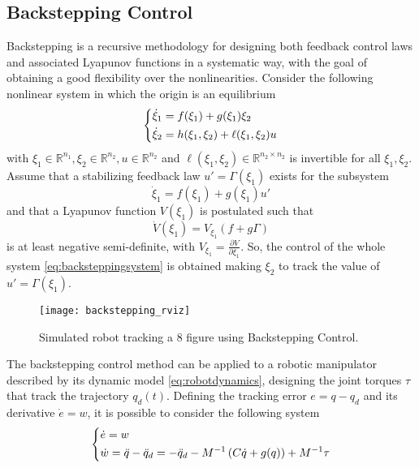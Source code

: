 \subsection{Backstepping Control}
Backstepping is a recursive methodology for designing both feedback control laws and associated Lyapunov functions in a systematic way, with the goal of obtaining a good flexibility over the nonlinearities. Consider the following nonlinear system in which the origin is an equilibrium
\begin{equation}
\begin{dcases}
\dot{\xi}_1 = f(\xi_1) + g(\xi_1)\xi_2 \\
\dot{\xi}_2 = h(\xi_1,\xi_2) + \ell(\xi_1,\xi_2)u
\end{dcases}
\label{eq:backsteppingsystem}
\end{equation}
with $\xi_1\in\mathbb{R}^{n_1}, \xi_2\in\mathbb{R}^{n_2},u\in\mathbb{R}^{n_2}$ and $\ell(\xi_1,\xi_2)\in\mathbb{R}^{n_2 \times n_2}$ is invertible for all $\xi_1,\xi_2$. Assume that a stabilizing feedback law $u'=\Gamma(\xi_1)$ exists for the subsystem 
\begin{equation}
\dot{\xi}_1 = f(\xi_1) + g(\xi_1)u'
\end{equation}
and that a Lyapunov function $V(\xi_1)$ is postulated such that
\begin{equation}
\dot{V}(\xi_1) = V_{\xi_1}(f + g\Gamma)
\end{equation}
is at least negative semi-definite, with $V_{\xi_1} = \frac{\partial{V}}{\partial{\xi_1}}$. So, the control of the whole system \eqref{eq:backsteppingsystem} is obtained making $\xi_2$ to track the value of $u'=\Gamma(\xi_1)$.
\begin{figure}[H]
	\centering
	\texttt{[image: backstepping\_rviz]}
	\caption{Simulated robot tracking a 8 figure using Backstepping Control.}
\end{figure}
The backstepping control method can be applied to a robotic manipulator described by its dynamic model \eqref{eq:robotdynamics}, designing the joint torques $\tau$ that track the trajectory $q_d(t)$. Defining the tracking error $e=q-q_d$ and its derivative $\dot{e}=w$, it is possible to consider the following system
\begin{equation}
\begin{dcases}
\dot{e} = w\\
\dot{w} = \ddot{q}-\ddot{q}_d = -\ddot{q}_d - M^{-1}\left(C\dot{q}+g(q)\right) + M^{-1}\tau
\end{dcases}
\label{eq:lagrangianbackstepping}
\end{equation}
